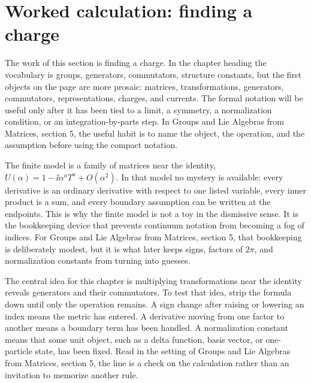 \section{Worked calculation: finding a charge}













The work of this section is finding a charge.  In the chapter heading the vocabulary is groups, generators, commutators, structure constants, but the first objects on the page are more prosaic: matrices, transformations, generators, commutators, representations, charges, and currents.  The formal notation will be useful only after it has been tied to a limit, a symmetry, a normalization condition, or an integration-by-parts step.  In Groups and Lie Algebras from Matrices, section 5, the useful habit is to name the object, the operation, and the assumption before using the compact notation.

The finite model is a family of matrices near the identity, \(U(\alpha)=1-\ii\alpha^aT^a+O(\alpha^2)\).  In that model no mystery is available: every derivative is an ordinary derivative with respect to one listed variable, every inner product is a sum, and every boundary assumption can be written at the endpoints.  This is why the finite model is not a toy in the dismissive sense.  It is the bookkeeping device that prevents continuum notation from becoming a fog of indices.  For Groups and Lie Algebras from Matrices, section 5, that bookkeeping is deliberately modest, but it is what later keeps signs, factors of \(2\pi\), and normalization constants from turning into guesses.

The central idea for this chapter is multiplying transformations near the identity reveals generators and their commutators.  To test that idea, strip the formula down until only the operation remains.  A sign change after raising or lowering an index means the metric has entered.  A derivative moving from one factor to another means a boundary term has been handled.  A normalization constant means that some unit object, such as a delta function, basis vector, or one-particle state, has been fixed.  Read in the setting of Groups and Lie Algebras from Matrices, section 5, the line is a check on the calculation rather than an invitation to memorize another rule.

